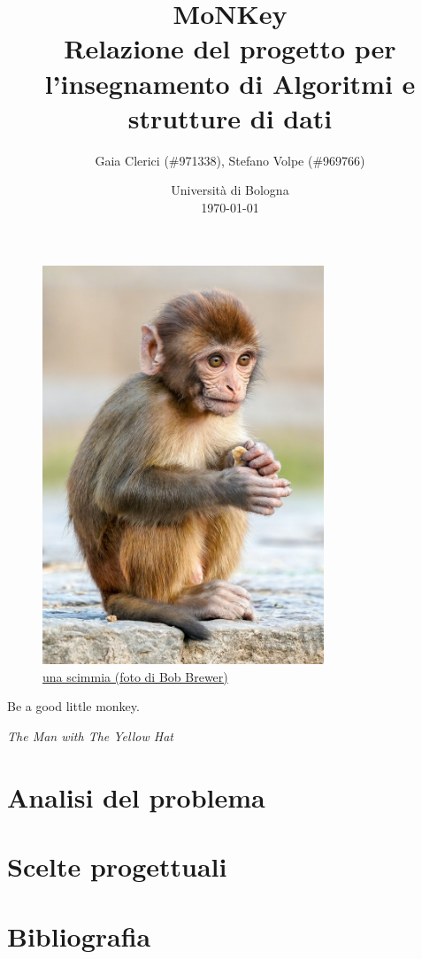 \documentclass[a4paper]{article}
\title{MoNKey \\
\small Relazione del progetto per l'insegnamento di Algoritmi e strutture di
dati}
\author{
  Gaia Clerici (\#971338),
  Stefano Volpe (\#969766)
}
\date{
	Universit\`a di Bologna \\
  \today
}
\begin{document}
\maketitle

\begin{figure}[h]
  \includegraphics[width=0.75\textwidth]{monkey}
  \centering
  \caption{\href{https://unsplash.com/photos/daC7ji1EMHM}{una scimmia
  (foto di Bob Brewer)}}
\end{figure}

\pagebreak

\epigraph{Be a good little monkey.}{\textit{The Man with The Yellow Hat}}

\section{Analisi del problema}

\section{Scelte progettuali}

\section{Bibliografia}
\end{document}
